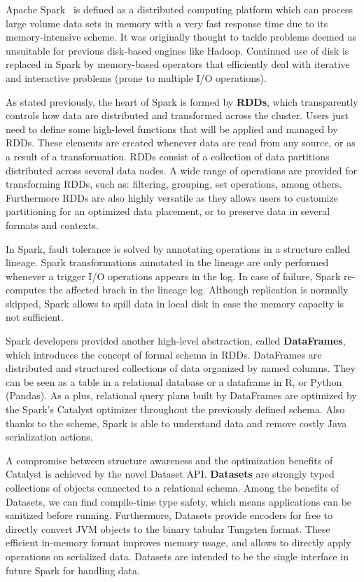 \documentclass[3p,review]{elsarticle}
\begin{document}
	Apache Spark~\cite{hamstra15} is defined as a distributed computing platform which can process large volume data sets in memory with a very fast response time due to its memory-intensive scheme. It was originally thought to tackle problems deemed as unsuitable for previous disk-based engines like Hadoop. Continued use of disk is replaced in Spark by memory-based operators that efficiently deal with iterative and interactive problems (prone to multiple I/O operations). 
	
	As stated previously, the heart of Spark is formed by \textbf{RDDs}, which transparently controls how data are distributed and transformed across the cluster. Users just need to define some high-level functions that will be applied and managed by RDDs. These elements are created whenever data are read from any source, or as a result of a transformation. RDDs consist of a collection of data partitions distributed across several data nodes. A wide range of operations are provided for transforming RDDs, such as: filtering, grouping, set operations, among others. Furthermore RDDs are also highly versatile as they allows users to customize partitioning for an optimized data placement, or to preserve data in several formats and contexts.
	
	In Spark, fault tolerance is solved by annotating operations in a structure called lineage. Spark transformations annotated in the lineage are only performed whenever a trigger I/O operations appears in the log. In case of failure, Spark re-computes the affected brach in the lineage log. Although replication is normally skipped, Spark allows to spill data in local disk in case the memory capacity is not sufficient. 
	
	Spark developers provided another high-level abstraction, called \textbf{DataFrames}, which introduces the concept of formal schema in RDDs. DataFrames are distributed and structured collections of data organized by named columns. They can be seen as a table in a relational database or a dataframe in R, or Python (Pandas). As a plus, relational query plans built by DataFrames are optimized by the Spark's Catalyst optimizer throughout the previously defined schema. Also thanks to the scheme, Spark is able to understand data and remove costly Java serialization actions.
	
	A compromise between structure awareness and the optimization benefits of Catalyst is achieved by the novel Dataset API. \textbf{Datasets} are strongly typed collections of objects connected to a relational schema. Among the benefits of Datasets, we can find compile-time type safety, which means applications can be sanitized before running. Furthermore, Datasets provide encoders for free to directly convert JVM objects to the binary tabular Tungsten format. These efficient in-memory format improves memory usage, and allows to directly apply operations on serialized data. Datasets are intended to be the single interface in future Spark for handling data.
	
\end{document}
